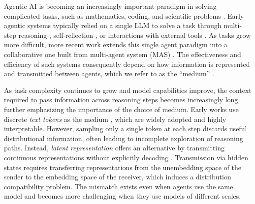 \documentclass[11pt]{article}
\begin{document}
Agentic AI is becoming an increasingly important paradigm in solving complicated tasks, such as mathematics, coding, and scientific problems \citep{agentic_ai}. Early agentic systems typically relied on a single LLM to solve a task through multi-step reasoning \citep{wei2022cot}, self-reflection \citep{shinn2023reflexion}, or interactions with external tools \citep{schick2023toolformer}. As tasks grow more difficult, more recent work extends this single agent paradigm into a collaborative one built from multi-agent system (MAS) \citep{hong2024metagpt}. The effectiveness and efficiency of such systems consequently depend on how information is represented and transmitted between agents, which we refer to as the ``medium'' \citep{multiagent_survey,tran2025multi}.


As task complexity continues to grow and model capabilities improve, the context required to pass information across reasoning steps becomes increasingly long, further emphasizing the importance of the choice of medium. Early works use discrete \textit{text tokens} as the medium \citep{wei2022cot,hong2024metagpt,zhang2024chainofagents}, which are widely adopted and highly interpretable. However, sampling only a single token at each step discards useful distributional information, often leading to incomplete exploration of reasoning paths. Instead, \textit{latent representation} offers an alternative by transmitting continuous representations without explicitly decoding \citep{coconut}. Transmission via hidden states requires transferring representations from the unembedding space of the sender to the embedding space of the receiver, which induces a distribution compatibility problem. The mismatch exists even when agents use the same model and becomes more challenging when they use models of different scales. 


\end{document}
